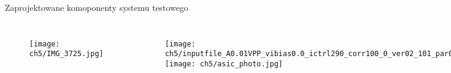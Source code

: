 \begin{frame}{Zaprojektowane komoponenty systemu testowego}



\begin{columns}
    \vspace{-1em}

    \begin{figure}[H]
    \centering
        \texttt{[image: ch5/IMG\_3725.jpg]}
    \end{figure}

\vspace{-1.5em}
    \begin{figure}[H]
    \centering
        \texttt{[image: ch5/inputfile\_A0.01VPP\_vibias0.0\_ictrl290\_corr100\_0\_ver02\_101\_par0\_test\_generator.png]} 
        \texttt{[image: ch5/asic\_photo.jpg]}

    \end{figure}
\end{columns}


\end{frame}


